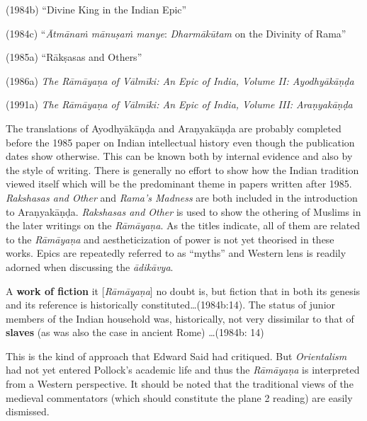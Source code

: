 (1984b) “Divine King in the Indian Epic”

(1984c) “\textit{Ātmānaṁ mānuṣaṁ manye}: \textit{Dharmākūtam} on the Divinity of Rama”

(1985a) “Rākṣasas and Others”

(1986a)\textit{ The Rāmāyaṇa of Vālmīki: An Epic of India, Volume II: Ayodhyākāṇḍa}

(1991a)\textit{ The Rāmāyaṇa of Vālmīki: An Epic of India, Volume III: Araṇyakāṇḍa}

The translations of Ayodhyākāṇḍa and Araṇyakāṇḍa are probably completed before the 1985 paper on Indian intellectual history even though the publication dates show otherwise. This can be known both by internal evidence and also by the style of writing. There is generally no effort to show how the Indian tradition viewed itself which will be the predominant theme in papers written after 1985. \textit{Rakshasas and Other} and \textit{Rama’s Madness} are both included in the introduction to Araṇyakāṇḍa. \textit{Rakshasas and Other} is used to show the othering of Muslims in the later writings on the \textit{Rāmāyaṇa}. As the titles indicate, all of them are related to the \textit{Rāmāyaṇa} and aestheticization of power is not yet theorised in these works. Epics are repeatedly referred to as “myths” and Western lens is readily adorned when discussing the \textit{ādikāvya}.

\begin{myquote}
A \textbf{work of fiction} it [\textit{Rāmāyaṇa}] no doubt is, but fiction that in both its genesis and its reference is historically constituted…(1984b:14). The status of junior members of the Indian household was, historically, not very dissimilar to that of \textbf{slaves} (as was also the case in ancient Rome) …(1984b: 14)
\end{myquote}

This is the kind of approach that Edward Said had critiqued. But \textit{Orientalism }had not yet entered Pollock’s academic life and thus the \textit{Rāmāyaṇa }is interpreted from a Western perspective. It should be noted that the traditional views of the medieval commentators (which should constitute the plane 2 reading) are easily dismissed.

